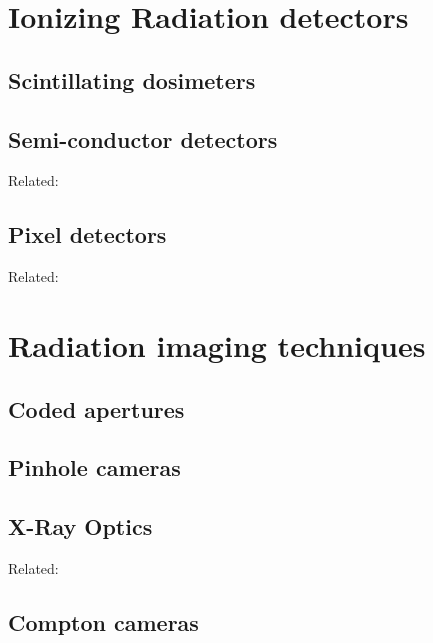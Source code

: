 \documentclass[a4paper,11pt,titlepage,twoside]{book}
\begin{document}

\section{Ionizing Radiation detectors}


\subsection{Scintillating dosimeters}

\subsection{Semi-conductor detectors}

Related: \cite{urban2017vzlusat}

\subsection{Pixel detectors}

Related: \cite{baca2016miniaturized, baca2019timepix, baca2018rospix, baca2018timepix}


\section{Radiation imaging techniques}


\subsection{Coded apertures}

\subsection{Pinhole cameras}

\subsection{X-Ray Optics}

Related: \cite{baca2016miniaturized}

\subsection{Compton cameras}
\end{document}
